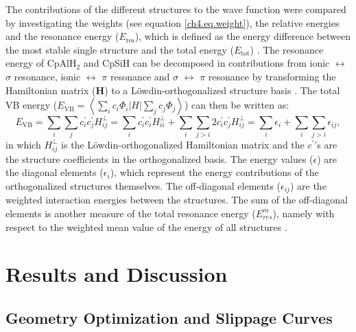 The contributions of the different structures to the wave function were compared by investigating the weights (see equation \ref{ch4.eq.weight}), the relative energies and the resonance energy ($E_\mathrm{res}$), which is defined as the energy difference between the most stable single structure and the total energy ($E_\mathrm{tot}$) \cite{pauling}. The resonance energy of CpAlH$_2$ and CpSiH can be decomposed in contributions from ionic $\leftrightarrow$ $\sigma$ resonance, ionic $\leftrightarrow$ $\pi$ resonance and $\sigma$ $\leftrightarrow$ $\pi$ resonance by transforming the Hamiltonian matrix ($\mathbf{H}$) to a L\"owdin-orthogonalized \cite{lowdin} structure basis \cite{havenith}. The total VB energy ($E_\mathrm{VB}  = \left < \sum_{i} c_{i}\Phi{_i} | H | \sum_{j} c_{j}\Phi{_j} \right >$) can then be written as:
\begin{equation}
E_\mathrm{VB} = \sum_{i}\sum_{j}c^\prime_{i}c^\prime_{j}H_{ij}^{\bot}=\sum_{i}c^\prime_{i}c^\prime_{i}H_{ii}^{\bot}+\sum_{i}\sum_{j>i}2c^\prime_{i}c^\prime_{j}H_{ij}^{\bot}=\sum_{i}\epsilon_{i}+\sum_{i}\sum_{j>i}\epsilon_{ij},
\label{ch4.eq.energ}
\end{equation}
in which $H_{ij}^{\bot}$ is the L\"owdin-orthogonalized Hamiltonian matrix and the $c^\prime$'s are the structure coefficients in the orthogonalized basis. The energy values ($\epsilon$) are the diagonal elements ($\epsilon_{i}$), which represent the energy contributions of the orthogonalized structures themselves. The off-diagonal elements  ($\epsilon_{ij}$) are the weighted interaction energies between the structures. The sum of the off-diagonal elements is another measure of the total resonance energy ($E^{m}_{res}$), namely with respect to the weighted mean value of the energy of all structures \cite{havenith}.

\section{Results and Discussion}

\subsection{\label{ch4.sec.slippage}Geometry Optimization and Slippage Curves}

